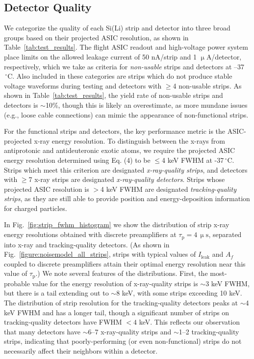\documentclass[journal]{IEEEtran}
\begin{document}
\subsection{Detector Quality}
We categorize the quality of each Si(Li) strip and detector into three broad groups based on their projected ASIC resolution, as shown in Table~\ref{tab:test_results}. The flight ASIC readout and high-voltage power system place limits on the allowed leakage current of 50 nA/strip and 1 $\upmu$A/detector, respectively, which we take as criteria for \textit{non-usable} strips and detectors at --37$\,^\circ\text{C}$. Also included in these categories are strips which do not produce stable voltage waveforms during testing and detectors with $\ge$4 non-usable strips. As shown in Table~\ref{tab:test_results}, the yield rate of non-usable strips and detectors is ${\sim}$10\%, though this is likely an overestimate, as more mundane issues (e.g., loose cable connections) can mimic the appearance of non-functional strips.
%
\par For the functional strips and detectors, the key performance metric is the ASIC-projected x-ray energy resolution. To distinguish between the x-rays from antiprotonic and antideuteronic exotic atoms, we require the projected ASIC energy resolution determined using Eq. (4) to be $\leq$4 keV FWHM at -37$\,^\circ\text{C}$. Strips which meet this criterion are designated \textit{x-ray-quality strips}, and detectors with $\ge$7 x-ray strips are designated \textit{x-ray-quality detectors}. Strips whose projected ASIC resolution is $>$4 keV FWHM are designated \textit{tracking-quality strips}, as they are still able to provide position and energy-deposition information for charged particles.
%
\par In Fig.~\ref{fig:strip_fwhm_histogram} we show the distribution of strip x-ray energy resolutions obtained with discrete preamplifiers at ${\tau_\text{p} = 4\,\upmu\text{s}}$, separated into x-ray and tracking-quality detectors. (As shown in Fig.~\ref{figure:noisemodel_all_strips}, strips with typical values of $I_\text{leak}$ and $A_f$ coupled to discrete preamplifiers attain their optimal energy resolution near this value of $\tau_\text{p}$.) We note several features of the distributions. First, the most-probable value for the energy resolution of x-ray-quality strips is ${\sim}$3 keV FWHM, but there is a tail extending out to ${\sim}$8 keV, with some strips exceeding 10 keV. The distribution of strip resolution for the tracking-quality detectors peaks at ${\sim}$4 keV FWHM and has a longer tail, though a significant number of strips on tracking-quality detectors have FWHM $<4$ keV. This reflects our observation that many detectors have ${\sim}$6--7 x-ray-quality strips and ${\sim}$1--2 tracking-quality strips, indicating that poorly-performing (or even non-functional) strips do not necessarily affect their neighbors within a detector.
\end{document}
